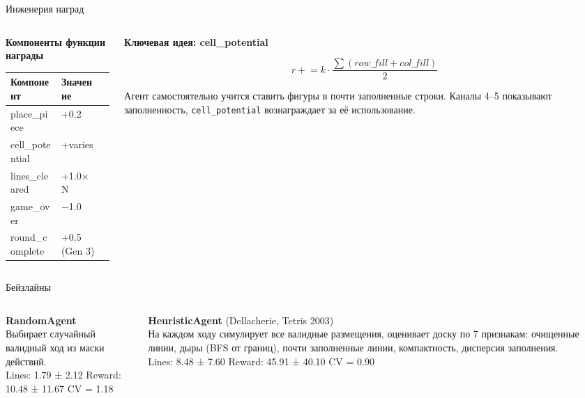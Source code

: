 \documentclass[aspectratio=169]{beamer}
\begin{document}
	\begin{frame}{Инженерия наград}
		\begin{columns}[t]
			\begin{column}{0.50\textwidth}
				\textbf{Компоненты функции награды}
				
				\bigskip
				\begin{tabular}{@{}lll@{}}
					\toprule
					\rowcolor{ThemeGridStroke}
					\color{ThemeCellFilled}Компонент & \color{ThemeCellFilled}Значение & \\
					\midrule
					place\_piece    & +0.2 \\
					cell\_potential & +varies \\
					lines\_cleared  & +1.0×N  \\
					game\_over      & −1.0 \\
					round\_complete & +0.5 (Gen 3)\\
					\bottomrule
				\end{tabular}
			\end{column}
			\begin{column}{0.46\textwidth}
				\textbf{Ключевая идея: cell\_potential}
				
				\smallskip
				\[
				r \mathrel{+}= k \cdot \frac{\sum (row\_fill + col\_fill)}{2}
				\]
				
				\bigskip
				Агент самостоятельно учится ставить фигуры в почти заполненные строки.
				Каналы 4–5 показывают заполненность,
				\texttt{cell\_potential} вознаграждает за её использование.
			\end{column}
		\end{columns}
	\end{frame}
	
	\begin{frame}{Бейзлайны}
		\begin{columns}[t]
			\begin{column}{0.50\textwidth}
				\textbf{RandomAgent} \\
				\medskip
				Выбирает случайный валидный ход из маски действий.\\
				\bigskip
				Lines: 1.79 ± 2.12 \quad Reward: 10.48 ± 11.67 \quad CV = 1.18
			\end{column}
			\begin{column}{0.46\textwidth}
				\textbf{HeuristicAgent} (Dellacherie, Tetris 2003)\\
				\medskip
				На каждом ходу симулирует все валидные размещения,
				оценивает доску по 7 признакам:
				очищенные линии, дыры (BFS от границ),
				почти заполненные линии, компактность, дисперсия заполнения.\\
				\bigskip
				Lines: 8.48 ± 7.60 \quad Reward: 45.91 ± 40.10 \quad CV = 0.90
			\end{column}
		\end{columns}
	\end{frame}
	
\end{document}
